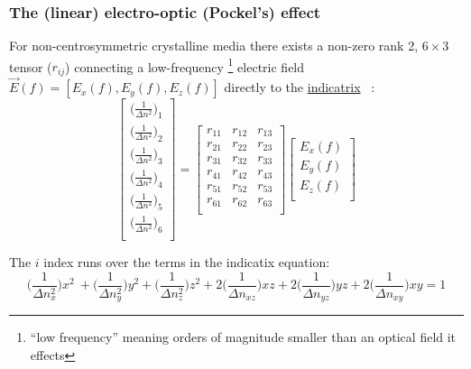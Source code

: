 \subsubsection{The (linear) electro-optic (Pockel's) effect}

For non-centrosymmetric crystalline media there exists a non-zero rank 2, $6 \times 3$ tensor ($r_{ij}$) connecting a low-frequency \footnote{``low frequency'' meaning orders of magnitude smaller than an optical field it effects} electric field $\vec{E}(f) = [E_x(f), E_y(f), E_z(f)]$ directly to the \hyperref[sec:indicatrix]{indicatrix} ~\cite{yariv,nye}:
\begin{equation}
  \left[ {\begin{array}{c}
   \big( \frac{1}{\Delta n ^2 } \big)_1 \\
   \big( \frac{1}{\Delta n ^2 } \big)_2 \\
   \big( \frac{1}{\Delta n ^2 } \big)_3 \\
   \big( \frac{1}{\Delta n ^2 } \big)_4 \\
   \big( \frac{1}{\Delta n ^2 } \big)_5 \\
   \big( \frac{1}{\Delta n ^2 } \big)_6 \\
  \end{array} } \right]
  =
%
 \left[ {\begin{array}{ccc}
   r_{11} & r_{12} & r_{13}\\
   r_{21} & r_{22} & r_{23}\\
   r_{31} & r_{32} & r_{33}\\
   r_{41} & r_{42} & r_{43}\\
   r_{51} & r_{52} & r_{53}\\
   r_{61} & r_{62} & r_{63}\\
  \end{array}} \right]
 \left[{\begin{array}{c}
   E_x (f)\\
   E_y (f)\\
   E_z (f)\\
 \end{array}} \right]
\end{equation}

\noindent The $i$ index runs over the terms in the indicatix equation:
\begin{equation}
\bigg(\frac{1}{\Delta n_x^2} \bigg) x^2\ + \bigg(\frac{1}{\Delta n_y^2} \bigg) y^2 + \bigg(\frac{1}{\Delta n_z^2} \bigg) z^2 + 2 \bigg(\frac{1}{\Delta n_{xz}} \bigg)xz + 2 \bigg(\frac{1}{\Delta n_{yz}} \bigg)yz + 2 \bigg(\frac{1}{\Delta n_{xy}} \bigg)xy = 1
\end{equation}

